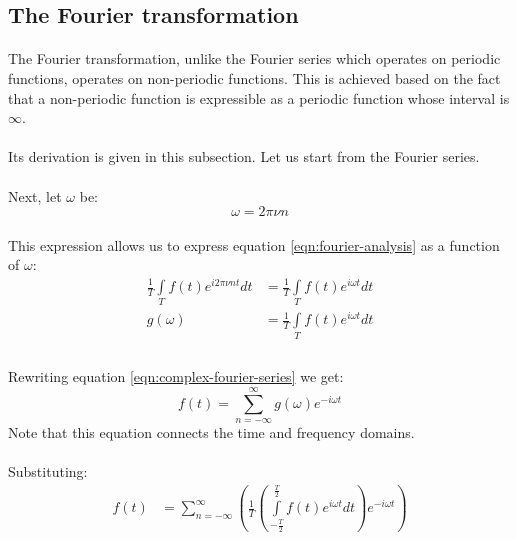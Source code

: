 \documentclass{article}
\begin{document}
\subsection{The Fourier transformation}

\paragraph*{}
The Fourier transformation, unlike the Fourier series which operates on
periodic functions, operates on non-periodic functions. This is achieved based
on the fact that a non-periodic function is expressible as a periodic function
whose interval is $\infty$.

\paragraph*{}
Its derivation is given in this subsection. Let us start from the Fourier
series.

\paragraph*{}
Next, let $\omega$ be:
$$\omega = 2 \pi \nu n$$

\paragraph*{}
This expression allows us to express equation \ref{eqn:fourier-analysis} as a
function of $\omega$:
\begin{equation}
	\begin{aligned}	
		\frac{1}{T} \int\limits_T f(t) e^{i 2 \pi \nu n t} dt &= \frac{1}{T} \int\limits_T
		f(t) e^{i \omega t} dt \\
		g(\omega) &= \frac{1}{T} \int\limits_T f(t) e^{i \omega t} dt \\
	\end{aligned}
\end{equation}

\paragraph*{}
Rewriting equation \ref{eqn:complex-fourier-series} we get:
$$f(t) = \sum_{n = - \infty}^{\infty} g(\omega) e^{-i \omega t}$$
Note that this equation connects the time and frequency domains.

\paragraph*{}
Substituting:
\begin{equation}
	\begin{aligned}
	f(t) &= \sum_{n = - \infty}^{\infty} \left( \frac{1}{T} \left(
	\int\limits_{-\frac{T}{2}}^{\frac{T}{2}} f(t) e^{i \omega t} dt\right)e^{-i \omega
	t} \right)
	\end{aligned}
	\label{eqn:substituted-cplx-f-series}
\end{equation}
\end{document}

